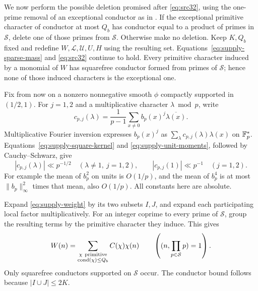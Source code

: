 We now perform the possible deletion promised after
\eqref{eq:src32}, using the one-prime removal of an exceptional conductor
as in \cite[Section~7, following Lemma~7.1]{FordGreenKonyaginMaynardTao2018}.
If the exceptional primitive character of
conductor at most \(Q_b\) has conductor equal to a product of primes
in \(\mathcal S\), delete one of those primes from \(\mathcal S\).
Otherwise make no deletion. Keep \(K,Q_b\) fixed and redefine
\(W,\mathcal L,\mathcal U,U,H\) using the resulting set.
Equations~\eqref{eq:supply-sparse-mass} and \eqref{eq:src32}
continue to hold. Every primitive character induced by a monomial
of \(W\) has squarefree conductor formed from primes of
\(\mathcal S\); hence none of those induced characters is the
exceptional one.

Fix from now on a nonzero nonnegative smooth \(\phi\) compactly
supported in \((1/2,1)\).
For \(j=1,2\) and a multiplicative character \(\lambda\bmod p\),
write
\[
 c_{p,j}(\lambda)
 =\frac1{p-1}\sum_{x\ne0}b_p(x)^j\overline{\lambda(x)}.
\]
Multiplicative Fourier inversion expresses \(b_p(x)^j\) as
\(\sum_\lambda c_{p,j}(\lambda)\lambda(x)\) on \(\mathbb F_p^*\).
Equations~\eqref{eq:supply-square-kernel} and
\eqref{eq:supply-unit-moments}, followed by Cauchy--Schwarz, give
\begin{equation}\label{eq:supply-mellin-coefficients}
 |c_{p,j}(\lambda)|\ll p^{-1/2}\quad(\lambda\ne1,\ j=1,2),
 \qquad |c_{p,j}(1)|\ll p^{-1}\quad(j=1,2).
\end{equation}
For example the mean of \(b_p^2\) on units is \(O(1/p)\), and
the mean of \(b_p^4\) is at most
\(\|b_p\|_\infty^2\) times that mean, also \(O(1/p)\).
All constants here are absolute.

Expand \eqref{eq:supply-weight} by its two subsets \(I,J\), and
expand each participating local factor multiplicatively.
For an integer coprime to every prime of \(\mathcal S\), group
the resulting terms by the primitive character they induce.
This gives
\begin{equation}\label{eq:supply-grouped-expansion}
 W(n)=\sum_{\substack{\chi\ {\rm primitive}\\
                         \operatorname{cond}(\chi)\le Q_b}}
             C(\chi)\chi(n)
 \qquad
 \left((n,\prod_{p\in\mathcal S}p)=1\right).
\end{equation}
Only squarefree conductors supported on \(\mathcal S\) occur.
The conductor bound follows because \(|I\cup J|\le2K\).

